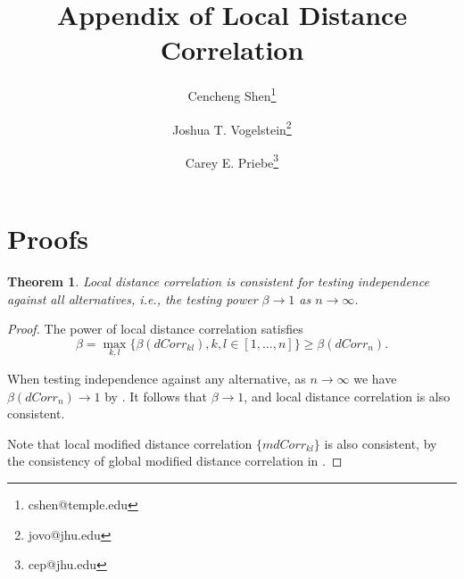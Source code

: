 \documentclass[12pt]{article}
\newtheorem{thm}{Theorem}
\begin{document}
\def\spacingset#1{\renewcommand{\baselinestretch}%
{#1}\small\normalsize} \spacingset{1}

\title{\bf Appendix of Local Distance Correlation}
\author[1]{Cencheng Shen\thanks{cshen@temple.edu}}
\author[2]{Joshua T. Vogelstein\thanks{jovo@jhu.edu}}
\author[3]{Carey E. Priebe\thanks{cep@jhu.edu}}
\maketitle

\newpage
\spacingset{1.45} %

\section{Proofs}
\begin{thm}
\label{thm1}
Local distance correlation is consistent for testing independence against all alternatives, i.e., the testing power $\beta \rightarrow 1$ as $n \rightarrow \infty$. 
\end{thm}
\begin{proof}
The power of local distance correlation satisfies
\begin{equation}
\beta=\max_{k,l}\{\beta(dCorr_{kl}), k,l\in [1,\ldots,n]\} \geq \beta(dCorr_{n}).
\end{equation}

When testing independence against any alternative, as $n \rightarrow \infty$ we have $\beta(dCorr_{n}) \rightarrow 1$ by \cite{SzekelyRizzoBakirov2007}. It follows that $\beta \rightarrow 1$, and local distance correlation is also consistent.

Note that local modified distance correlation $\{mdCorr_{kl}\}$ is also consistent, by the consistency of global modified distance correlation in \cite{SzekelyRizzo2013a}.
\end{proof}
\end{document}
